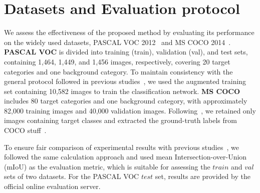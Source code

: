 



















\newcommand{\supplementarytitle}{
}


\supplementarytitle

\renewcommand{\thesection}{\arabic{section}}
\setcounter{section}{0}

\renewcommand{\thefigure}{\arabic{figure}}
\setcounter{figure}{0}

\renewcommand{\thetable}{\arabic{table}}
\setcounter{table}{0}


\section{Datasets and Evaluation protocol}

    We assess the effectiveness of the proposed method by evaluating its performance on the widely used datasets, PASCAL VOC 2012~\cite{everingham2010pascal} and MS COCO 2014~\cite{lin2014microsoft}. \textbf{PASCAL VOC} is divided into training (train), validation (val), and test sets, containing 1,464, 1,449, and 1,456 images, respectively, covering 20 target categories and one background category. To maintain consistency with the general protocol followed in previous studies~\cite{xu2022multi,cheng2023out}, we used the augmented training set containing 10,582 images to train the classification network. \textbf{MS COCO} includes 80 target categories and one background category, with approximately 82,000 training images and 40,000 validation images. Following~\cite{lee2021railroad}, we retained only images containing target classes and extracted the ground-truth labels from COCO stuff~\cite{caesar2018coco}.
    
    To ensure fair comparison of experimental results with previous studies~\cite{xu2022multi,cheng2023out}, we followed the same calculation  approach and used mean Intersection-over-Union (mIoU) as the evaluation metric, which is suitable for assessing the \(train\) and \(val\) sets of two datasets. For the PASCAL VOC \(test\) set, results are provided by the official online evaluation server.

